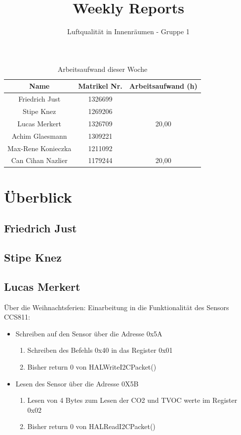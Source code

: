 \documentclass[]{article}
\title{Weekly Reports}
\author{Luftqualität in Innenräumen - Gruppe 1}
\begin{document}
\maketitle

\begin{table}[h!]
	\centering
	\begin{tabular}{|c|c|c|}
		\hline
		{\textbf{Name}}				&		{\textbf{Matrikel Nr.}} & {\textbf{Arbeitsaufwand (h)}} \\
		\hline
		Friedrich Just				&		1326699 				&		\\
		\hline
		Stipe Knez				&		1269206 				&		\\
		\hline
		Lucas Merkert				&		1326709					&	20,00	\\
		\hline
		Achim Glaesmann				&		1309221					&		\\
		\hline
		Max-Rene Konieczka			&		1211092					&		\\
		\hline
		Can Cihan Nazlier			&		1179244					&	20,00	\\
		\hline
	\end{tabular}
	\caption{Arbeitsaufwand dieser Woche}
	\label{tab:worakload}
\end{table}



\section{Überblick}


\subsection{Friedrich Just}

\subsection{Stipe Knez}

\subsection{Lucas Merkert}
Über die Weihnachtsferien: Einarbeitung in die Funktionalität des Sensors CCS811:
\begin{itemize}
	\item Schreiben auf den Sensor über die Adresse 0x5A
	\begin{enumerate}
		\item Schreiben des Befehls 0x40 in das Register 0x01
		\item Bisher return 0 von HALWriteI2CPacket()
	\end{enumerate}
	\item Lesen des Sensor über die Adresse 0X5B
		\begin{enumerate}
			\item Lesen von 4 Bytes zum Lesen der CO2 und TVOC werte im Register 0x02
			\item Bisher return 0 von HALReadI2CPacket()
		\end{enumerate}
	\end{itemize}
\end{document}
